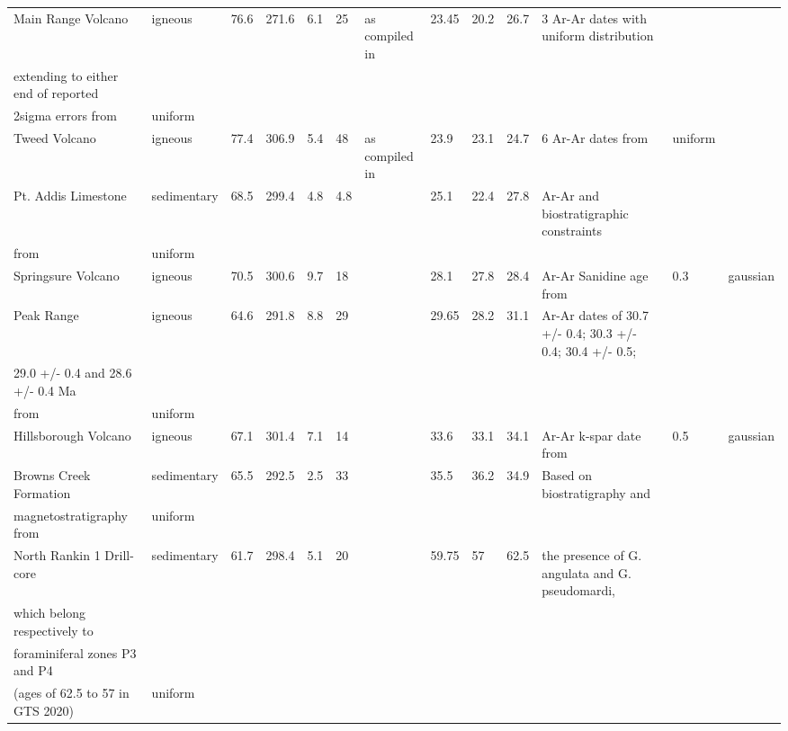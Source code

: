 \documentclass[11pt,letterpaper]{article}
\begin{document}
\begin{table}
{\begin{tabular}{lllllllllllll}
Main Range Volcano               & igneous     & 76.6 & 271.6 & 6.1 & 25  & as compiled in \cite{Hansma2019a} & 23.45      & 20.2     & 26.7     & 3 Ar-Ar dates with uniform distribution \\ extending to either end of reported \\ 2sigma errors from \cite{Knesel2008a}           & uniform           \\
Tweed Volcano                    & igneous     & 77.4 & 306.9 & 5.4 & 48  & as compiled in \cite{Hansma2019a} & 23.9       & 23.1     & 24.7     & 6 Ar-Ar dates from \cite{Knesel2008a}                                                                                     & uniform           \\
Pt. Addis Limestone              & sedimentary & 68.5 & 299.4 & 4.8 & 4.8 & \cite{Idnurm1985a}                & 25.1       & 22.4     & 27.8     & Ar-Ar and biostratigraphic constraints \\ from \cite{Idnurm1985a, McLaren2009a}                                              & uniform           \\
Springsure Volcano               & igneous     & 70.5 & 300.6 & 9.7 & 18  & \cite{Hansma2019a}                & 28.1       & 27.8     & 28.4     & Ar-Ar Sanidine age from \cite{Cohen2013a}                                           & 0.3                                                      & gaussian          \\
Peak Range                       & igneous     & 64.6 & 291.8 & 8.8 & 29  & \cite{Hansma2019a}                & 29.65      & 28.2     & 31.1     & Ar-Ar dates of 30.7 +/- 0.4; 30.3 +/- 0.4; 30.4 +/- 0.5; \\ 29.0 +/- 0.4 and 28.6 +/- 0.4 Ma \\ from \cite{Cohen2013a}           & uniform           \\
Hillsborough Volcano             & igneous     & 67.1 & 301.4 & 7.1 & 14  & \cite{Hansma2019a}                & 33.6       & 33.1     & 34.1     & Ar-Ar k-spar date  from \cite{Cohen2013a}                                           & 0.5                                                      & gaussian          \\
Browns Creek Formation           & sedimentary & 65.5 & 292.5 & 2.5 & 33  & \cite{Idnurm1994a}                & 35.5       & 36.2     & 34.9     & Based on biostratigraphy and \\ magnetostratigraphy from \cite{Shafik1997a}                                                & uniform           \\
North Rankin 1 Drill- core       & sedimentary & 61.7 & 298.4 & 5.1 & 20  & \cite{Idnurm1985a}                & 59.75      & 57       & 62.5     & the presence of G. angulata and G. pseudomardi,\\ which belong respectively to \\ foraminiferal zones P3 and P4 \\ (ages of 62.5 to 57 in GTS 2020) & uniform          
\end{tabular}}
\label{tab:Aus_Cenozoic_poles}
\end{table}
\end{document}
